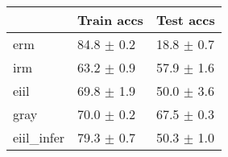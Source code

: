 \begin{tabular}{lll}
\toprule
{} &      Train accs &       Test accs \\
\midrule
erm        &  84.8 $\pm$ 0.2 &  18.8 $\pm$ 0.7 \\
irm        &  63.2 $\pm$ 0.9 &  57.9 $\pm$ 1.6 \\
eiil       &  69.8 $\pm$ 1.9 &  50.0 $\pm$ 3.6 \\
gray       &  70.0 $\pm$ 0.2 &  67.5 $\pm$ 0.3 \\
eiil_infer &  79.3 $\pm$ 0.7 &  50.3 $\pm$ 1.0 \\
\bottomrule
\end{tabular}


